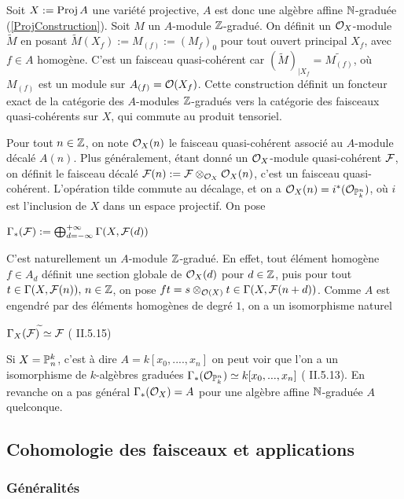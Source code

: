 \label{FQCProj}

Soit $X:=\operatorname{Proj} A$ une variété projective, $A$ est donc une algèbre affine $\mathbb{N}$-graduée (\ref{ProjConstruction}). Soit $M$ un $A$-module $\mathbb{Z}$-gradué. On définit un $\mathcal{O}_X$-module $\widetilde{M}$ en posant $\widetilde{M}(X_f):=M_{(f)}:=(M_f)_0$ pour tout ouvert principal $X_f$, avec $f\in A$ homogène. C'est un faisceau quasi-cohérent car $(\widetilde{M})_{|X_f}=\widetilde{M_{(f)}}$, où $M_{(f)}$ est un module sur $A_{(f)}=\mathcal{O}(X_f)$. Cette construction définit un foncteur exact de la catégorie des $A$-modules $\mathbb{Z}$-gradués vers la catégorie des faisceaux quasi-cohérents sur $X$, qui commute au produit tensoriel.

Pour tout $n\in \mathbb{Z}$, on note $\mathcal{O}_X(n)$ le faisceau quasi-cohérent associé au $A$-module décalé $A(n)$. Plus généralement, étant donné un $\mathcal{O}_X$-module quasi-cohérent $\mathcal{F}$, on définit le faisceau décalé $\mathcal{F}(n):=\mathcal{F}\otimes_{\mathcal{O}_X}\mathcal{O}_X(n)$, c'est un faisceau quasi-cohérent. L'opération tilde commute au décalage, et on a $\mathcal{O}_X(n)=i^*(\mathcal{O}_{\mathbb{P}_k^n})$, où $i$ est l'inclusion de $X$ dans un espace projectif. On pose 
\begin{center}
$\Gamma_*(\mathcal{F}):=\bigoplus_{d=-\infty}^{+\infty}\Gamma(X,\mathcal{F}(d))$
\end{center}
C'est naturellement un $A$-module $\mathbb{Z}$-gradué. En effet, tout élément homogène $f\in A_d$ définit une section globale de $\mathcal{O}_X(d)$ pour $d\in \mathbb{Z}$, puis pour tout $t\in \Gamma(X,\mathcal{F}(n)),\, n\in\mathbb{Z}$, on pose $ft=s\otimes_{\mathcal{O}(X)} t\in \Gamma(X, \mathcal{F}(n+d))$. Comme $A$ est engendré par des éléments homogènes de degré $1$, on a un isomorphisme naturel 
\begin{center}
$\Gamma_X(\mathcal{F})^{\widetilde{}}\simeq \mathcal{F}$ (\cite{Hartshorne} II.5.15)\end{center}

Si $X=\mathbb{P}_n^k$, c'est à dire $A=k[x_0,....,x_n]$ on peut voir que l'on a un isomorphisme de $k$-algèbres graduées $\Gamma_*(\mathcal{O}_{\mathbb{P}_k^n})\simeq k[x_0,...,x_n]$ (\cite{Hartshorne} II.5.13). En revanche on a pas général $\Gamma_*(\mathcal{O}_X)=A$ pour une algèbre affine $\mathbb{N}$-graduée $A$ quelconque.

\subsection{Cohomologie des faisceaux et applications}

\subsubsection{Généralités}

